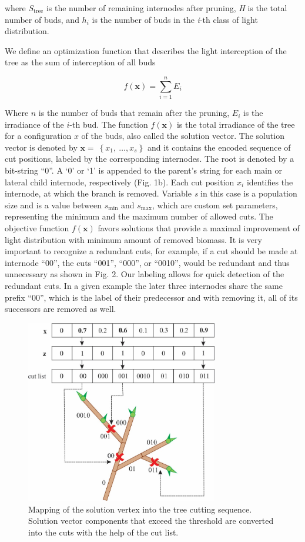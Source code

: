 \documentclass[1p]{elsarticle}
\begin{document}
where \(S_{\mathrm{\text{tree}}}\) is the number of remaining internodes
after pruning, \emph{H} is the total number of buds, and \(h_{i}\) is
the number of buds in the \emph{i}-th class of light distribution.

We define an optimization function that describes the light interception
of the tree as the sum of interception of all buds

\begin{equation}
   f\left( \mathbf{x} \right) = \sum_{i = 1}^{n}E_{i}
\end{equation}


Where $n$ is the number of buds that remain after the pruning,
$E_{i}$ is the irradiance of the \(i\)-th bud. The function $f(\mathbf{x})$ is the total irradiance of the tree for a configuration \(x\) of the buds,
also called the solution vector. The solution vector is denoted by
\(\mathbf{x} = \ \left\{ x_{1},\ \ldots,x_{s} \right\}\) and it contains
the encoded sequence of cut positions, labeled by the corresponding
internodes. The root is denoted by a bit-string ``0''. A `0' or `1' is
appended to the parent's string for each main or lateral child
internode, respectively (Fig. 1b). Each cut position \(x_{i}\)
identifies the internode, at which the branch is removed. Variable
\emph{s} in this case is a population size and is a value between
\(s_{\mathrm{\min}}\) and \(s_{\mathrm{\max}}\), which are custom set
parameters, representing the minimum and the maximum number of allowed
cuts. The objective function \(f(\mathbf{x})\) favors solutions that
provide a maximal improvement of light distribution with minimum amount
of removed biomass. It is very important to recognize a redundant cuts,
for example, if a cut should be made at internode ``00'', the cuts
``001'', ``000'', or ``0010'', would be redundant and thus unnecessary
as shown in Fig. 2. Our labeling allows for quick detection of the
redundant cuts. In a given example the later three internodes share the
same prefix ``00'', which is the label of their predecessor and with
removing it, all of its successors are removed as well.

\begin{figure}
    \centering
    \includegraphics[width=3.3in]{figs/image2.jpeg}
    \caption{Mapping of the solution vertex into the tree cutting
sequence. Solution vector components that exceed the threshold are
converted into the cuts with the help of the cut list.}
    \label{fig:my_label}
\end{figure}
\end{document}

